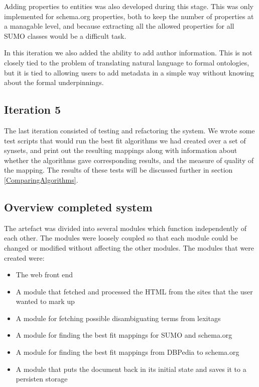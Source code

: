 Adding properties to entities was also developed during this stage.
This was only implemented for schema.org properties,
both to keep the number of properties at a managable level,
and because extracting all the allowed properties for all SUMO classes would be a difficult task.

In this iteration we also added the ability to add author information.
This is not closely tied to the problem of translating natural language to formal ontologies,
but it is tied to allowing users to add metadata in a simple way without knowing about the formal underpinnings.

\subsection{Iteration 5}
The last iteration consisted of testing and refactoring the system.
We wrote some test scripts that would run the best fit algorithms we had created over a set of synsets,
and print out the resulting mappings along with information about whether the algorithms gave corresponding results,
and the measure of quality of the mapping.
The results of these tests will be discussed further in section \ref{ComparingAlgorithms}.

\subsection{Overview completed system}
The artefact was divided into several modules which function independently of each other.
The modules were loosely coupled so that each module could be changed or modified without affecting the other modules.
The modules that were created were:
\begin{itemize}
	\item The web front end
	\item A module that fetched and processed the HTML from the sites that the user wanted to mark up
	\item A module for fetching possible disambiguating terms from lexitags
	\item A module for finding the best fit mappings for SUMO and schema.org
	\item A module for finding the best fit mappings from DBPedia to schema.org
	\item A module that puts the document back in its initial state and saves it to a persisten storage
\end{itemize}

